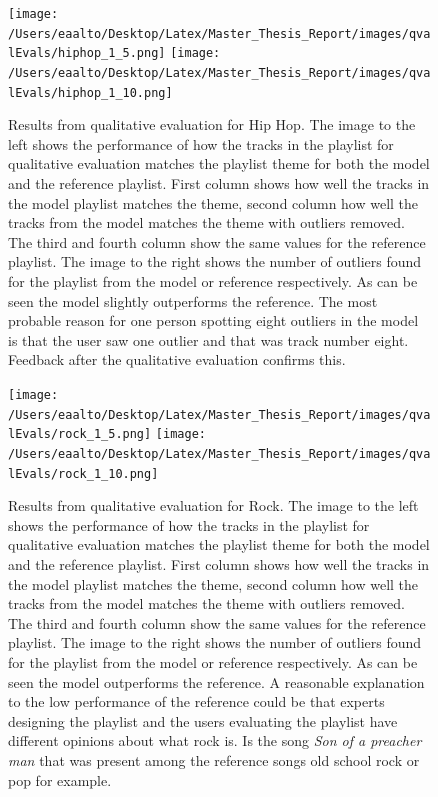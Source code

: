 \documentclass[a4paper,11pt]{kth-mag}
\begin{document}
\begin{figure}
\centering
\texttt{[image: /Users/eaalto/Desktop/Latex/Master\_Thesis\_Report/images/qvalEvals/hiphop\_1\_5.png]}
\texttt{[image: /Users/eaalto/Desktop/Latex/Master\_Thesis\_Report/images/qvalEvals/hiphop\_1\_10.png]}

\caption{Results from qualitative evaluation for Hip Hop. The image to the left shows the performance of how the tracks in the playlist for qualitative evaluation matches the playlist theme for both the model and the reference playlist. First column shows how well the tracks in the model playlist matches the theme, second column how well the tracks from the model matches the theme with outliers removed. The third and fourth column show the same values for the reference playlist. The image to the right shows the number of outliers found for the playlist from the model or reference respectively. As can be seen the model slightly outperforms the reference. The most probable reason for one person spotting eight outliers in the model is that the user saw one outlier and that was track number eight. Feedback after the qualitative evaluation confirms this.}
\end{figure}

\begin{figure}
\centering
\texttt{[image: /Users/eaalto/Desktop/Latex/Master\_Thesis\_Report/images/qvalEvals/rock\_1\_5.png]}
\texttt{[image: /Users/eaalto/Desktop/Latex/Master\_Thesis\_Report/images/qvalEvals/rock\_1\_10.png]}

\caption{Results from qualitative evaluation for Rock. The image to the left shows the performance of how the tracks in the playlist for qualitative evaluation matches the playlist theme for both the model and the reference playlist. First column shows how well the tracks in the model playlist matches the theme, second column how well the tracks from the model matches the theme with outliers removed. The third and fourth column show the same values for the reference playlist. The image to the right shows the number of outliers found for the playlist from the model or reference respectively. As can be seen the model outperforms the reference. A reasonable explanation to the low performance of the reference could be that experts designing the playlist and the users evaluating the playlist have different opinions about what rock is. Is the song \textit{Son of a preacher man} that was present among the reference songs old school rock or pop for example.}
\end{figure}
\end{document}
